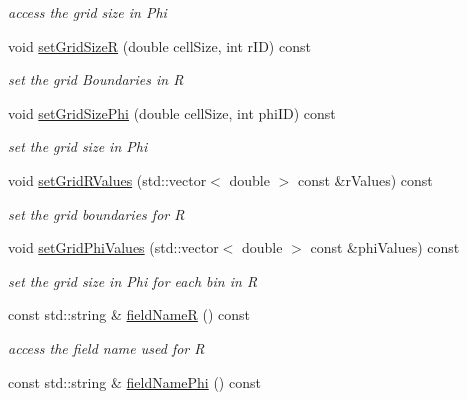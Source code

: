 \begin{DoxyCompactItemize}
\begin{DoxyCompactList}\small\item\em access the grid size in Phi \item\end{DoxyCompactList}\item 
void \hyperlink{class_d_d4hep_1_1_geometry_1_1_polar_grid_r_phi2_a4258086fe98603df2cda311d2f11cbbe}{setGridSizeR} (double cellSize, int rID) const 
\begin{DoxyCompactList}\small\item\em set the grid Boundaries in R \item\end{DoxyCompactList}\item 
void \hyperlink{class_d_d4hep_1_1_geometry_1_1_polar_grid_r_phi2_ada61afd30d69f07143282e934cecbc1e}{setGridSizePhi} (double cellSize, int phiID) const 
\begin{DoxyCompactList}\small\item\em set the grid size in Phi \item\end{DoxyCompactList}\item 
void \hyperlink{class_d_d4hep_1_1_geometry_1_1_polar_grid_r_phi2_a7ff94cffa0e209917f736acdf165d92f}{setGridRValues} (std::vector$<$ double $>$ const \&rValues) const 
\begin{DoxyCompactList}\small\item\em set the grid boundaries for R \item\end{DoxyCompactList}\item 
void \hyperlink{class_d_d4hep_1_1_geometry_1_1_polar_grid_r_phi2_a02638a23a1a35ec7b1142a678c7c3a6e}{setGridPhiValues} (std::vector$<$ double $>$ const \&phiValues) const 
\begin{DoxyCompactList}\small\item\em set the grid size in Phi for each bin in R \item\end{DoxyCompactList}\item 
const std::string \& \hyperlink{class_d_d4hep_1_1_geometry_1_1_polar_grid_r_phi2_a03ca58597b6ca26e247c5ba7f59b59b6}{fieldNameR} () const 
\begin{DoxyCompactList}\small\item\em access the field name used for R \item\end{DoxyCompactList}\item 
const std::string \& \hyperlink{class_d_d4hep_1_1_geometry_1_1_polar_grid_r_phi2_a956f68ffe127069c7dd7e51417cdece1}{fieldNamePhi} () const 

\end{DoxyCompactItemize}
